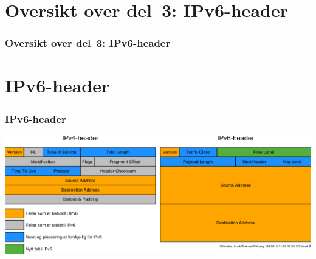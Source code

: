 \begin{frame}
  \partpage
\end{frame}

\section*{Oversikt over del~3: IPv6-header}
\begin{frame}
  \frametitle{Oversikt over del~3: IPv6-header}
    \tableofcontents
\end{frame}

\section{IPv6-header}
\begin{frame}
  \frametitle{IPv6-header}
  \begin{center}
      {\includegraphics[scale=.2274]{IPv4-vs-IPv6.pdf}}
  \end{center}
\end{frame}

